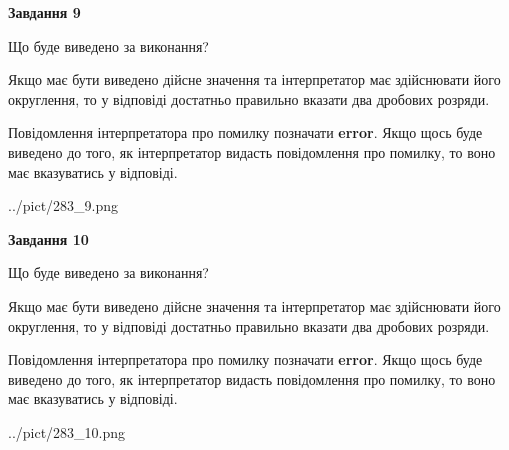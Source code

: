 \documentclass[12pt, ukrainian]{article}
\begin{document}
{\begin {Large}
{\begin {center}\textbf{Завдання 9}\end {center}}\par
Що буде виведено за виконання? \par

Якщо має бути виведено дійсне значення та інтерпретатор має здійснювати його округлення, 
то у відповіді достатньо правильно вказати два дробових розряди.

Повідомлення інтерпретатора про помилку позначати \textbf{error}.
Якщо щось буде виведено до того, як інтерпретатор видасть повідомлення про помилку, 
то воно має вказуватись у відповіді. \par

\begin{center}
	{../pict/283_9.png}
\end{center}
\newpage

{\begin {center}\textbf{Завдання 10}\end {center}}\par
Що буде виведено за виконання? \par

Якщо має бути виведено дійсне значення та інтерпретатор має здійснювати його округлення, 
то у відповіді достатньо правильно вказати два дробових розряди.

Повідомлення інтерпретатора про помилку позначати \textbf{error}.
Якщо щось буде виведено до того, як інтерпретатор видасть повідомлення про помилку, 
то воно має вказуватись у відповіді. \par

\begin{center}
	{../pict/283_10.png}
\end{center}
\newpage

\end {Large}}
\end{document}
